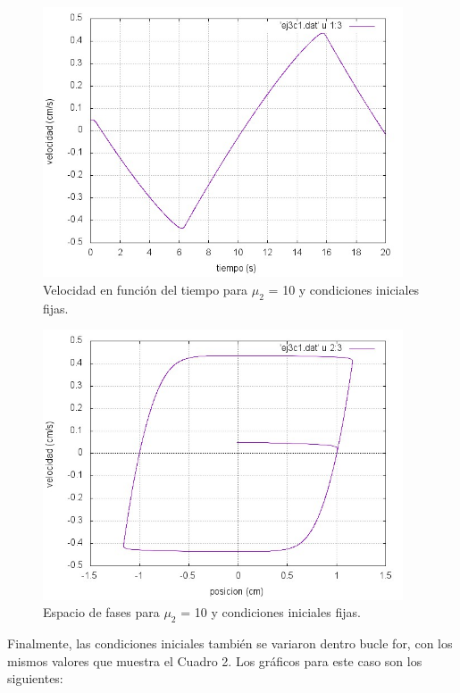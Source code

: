 \documentclass[a4paper,12pt]{article}
\begin{document}
\begin{itemize}
\begin{figure}[H]
\begin{center}
\includegraphics[height=8cm]{grafico_ej3c1_vVSt.jpg}
\caption[width=5cm]{Velocidad en funci\'on del tiempo para $\mu_2$ = 10 y condiciones iniciales fijas.}
\end{center}
\end{figure}

\begin{figure}[H]
\begin{center}
\includegraphics[height=8cm]{grafico_ej3c1_xVSv.jpg}
\caption[width=5cm]{Espacio de fases para $\mu_2$ = 10 y condiciones iniciales fijas.}
\end{center}
\end{figure}



Finalmente, las condiciones iniciales tambi\'en se variaron dentro bucle for, con los mismos valores que muestra el Cuadro 2. Los gr\'aficos para este caso son los siguientes:


\end{itemize}
\end{document}
